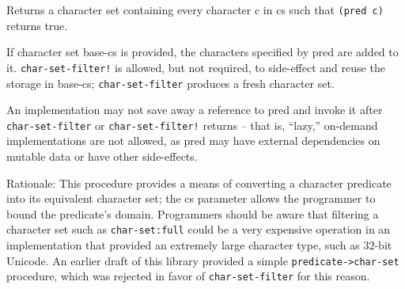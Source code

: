 \begin{entry}{%
  }

  Returns a character set containing every character c in cs such that
  \texttt{(pred\ c)} returns true.

  If character set base-cs is provided, the characters specified by
  pred are added to it. \texttt{char-set-filter!} is allowed, but not
  required, to side-effect and reuse the storage in base-cs;
  \texttt{char-set-filter} produces a fresh character set.

  An implementation may not save away a reference to pred and invoke
  it after \texttt{char-set-filter} or \texttt{char-set-filter!}
  returns -- that is, ``lazy,'' on-demand implementations are not
  allowed, as pred may have external dependencies on mutable data or
  have other side-effects.

  Rationale: This procedure provides a means of converting a character
  predicate into its equivalent character set; the cs parameter allows
  the programmer to bound the predicate's domain. Programmers should
  be aware that filtering a character set such as
  \texttt{char-set:full} could be a very expensive operation in an
  implementation that provided an extremely large character type, such
  as 32-bit Unicode. An earlier draft of this library provided a
  simple \texttt{predicate->char-set} procedure, which
  was rejected in favor of \texttt{char-set-filter} for this reason.
\end{entry}

